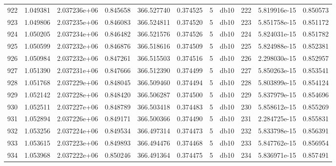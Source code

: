 \begin{tabular}{lrrrrrrlrrr}
922  &    1.049381 &        2.037236e+06 &  0.845658 &              366.527740 &    0.374525 &       5 &         db10 &    222 &   5.819916e-15 &      0.850573 \\
923  &    1.049806 &        2.037235e+06 &  0.846083 &              366.524811 &    0.374520 &       5 &         db10 &    223 &   5.851758e-15 &      0.851172 \\
924  &    1.050205 &        2.037234e+06 &  0.846482 &              366.521576 &    0.374526 &       5 &         db10 &    224 &   5.824031e-15 &      0.851782 \\
925  &    1.050599 &        2.037232e+06 &  0.846876 &              366.518616 &    0.374509 &       5 &         db10 &    225 &   5.824988e-15 &      0.852381 \\
926  &    1.050984 &        2.037232e+06 &  0.847261 &              366.515503 &    0.374516 &       5 &         db10 &    226 &   2.298030e-15 &      0.852957 \\
927  &    1.051390 &        2.037231e+06 &  0.847666 &              366.512390 &    0.374499 &       5 &         db10 &    227 &   5.850263e-15 &      0.853541 \\
928  &    1.051768 &        2.037229e+06 &  0.848045 &              366.509460 &    0.374494 &       5 &         db10 &    228 &   5.803899e-15 &      0.854124 \\
929  &    1.052142 &        2.037228e+06 &  0.848420 &              366.506287 &    0.374500 &       5 &         db10 &    229 &   5.837979e-15 &      0.854696 \\
930  &    1.052511 &        2.037227e+06 &  0.848789 &              366.503418 &    0.374483 &       5 &         db10 &    230 &   5.858612e-15 &      0.855269 \\
931  &    1.052894 &        2.037226e+06 &  0.849171 &              366.500366 &    0.374490 &       5 &         db10 &    231 &   2.284725e-15 &      0.855831 \\
932  &    1.053256 &        2.037224e+06 &  0.849534 &              366.497314 &    0.374473 &       5 &         db10 &    232 &   5.833798e-15 &      0.856391 \\
933  &    1.053615 &        2.037223e+06 &  0.849893 &              366.494476 &    0.374468 &       5 &         db10 &    233 &   5.847762e-15 &      0.856954 \\
934  &    1.053968 &        2.037222e+06 &  0.850246 &              366.491364 &    0.374475 &       5 &         db10 &    234 &   5.836971e-15 &      0.857491 \\

\end{tabular}
